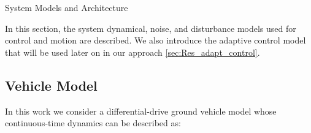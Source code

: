\begin{section}{System Models and Architecture}
	
\label{sec:modeling}
In this section, the system dynamical, noise, and disturbance models used for control and motion are described. We also introduce the adaptive control model that will be used later on in our approach \ref{sec:Res_adapt_control}.


\subsection{Vehicle Model}
In this work we consider a differential-drive ground vehicle model \cite{nutaro2011building} whose continuous-time dynamics can be described as:



\end{section}
